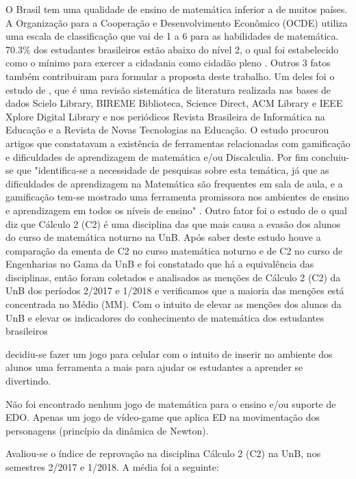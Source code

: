 O Brasil tem uma qualidade de ensino de matemática inferior a de muitos países. A Organização para a Cooperação e Desenvolvimento Econômico (OCDE) utiliza uma escala de classificação que vai de 1 a 6 para as habilidades de matemática. 70.3\% dos estudantes brasileiros estão abaixo do nível 2, o qual foi estabelecido como o mínimo para exercer a cidadania como cidadão pleno \cite{inep2015nivelcidadania}. Outros 3 fatos também contribuiram para formular a proposta deste trabalho. Um deles foi o estudo de \cite{revbibmatgam}, que é uma revisão sistemática de literatura realizada nas bases de dados Scielo Library, BIREME Biblioteca, Science Direct, ACM Library e IEEE Xplore Digital Library e nos periódicos Revista Brasileira de Informática na Educação e a Revista de Novas Tecnologias na Educação. O estudo procurou artigos que constatavam a existência de ferramentas relacionadas com gamificação e dificuldades de aprendizagem de matemática e/ou Discalculia. Por fim concluiu-se que "identifica-se a necessidade de pesquisas sobre esta temática, já que as dificuldades de aprendizagem na Matemática são frequentes
em sala de aula, e a gamificação tem-se mostrado uma ferramenta promissora nos ambientes de ensino e aprendizagem em todos os níveis de ensino" \cite{revbibmatgam}. Outro fator foi o estudo de \cite{evasaoC2} o qual diz que Cálculo 2 (C2) é uma disciplina das que mais causa a evasão dos alunos do curso de matemática noturno na UnB. Após saber deste estudo houve a comparação da ementa de C2 no curso matemática noturno e de C2 no curso de Engenharias no Gama da UnB e foi constatado que há a equivalência das disciplinas, então foram coletados e analisados as menções de Cálculo 2 (C2) da UnB dos períodos 2/2017 e 1/2018 e verificamos que a maioria das menções está concentrada no Médio (MM). Com o intuito de elevar as menções dos alunos da UnB e elevar os indicadores do conhecimento de matemática dos estudantes brasileiros 


decidiu-se fazer um jogo para celular com o intuito de inserir no ambiente dos alunos uma ferramenta a mais para ajudar os estudantes a aprender se divertindo. 

Não foi encontrado nenhum jogo de matemática para o ensino e/ou suporte de EDO. Apenas um jogo de vídeo-game que aplica ED na movimentação dos personagens (princípio da dinâmica de Newton)\cite{videoGameED}.

Avaliou-se o índice de reprovação na disciplina Cálculo 2 (C2) na UnB, nos semestres 2/2017 e 1/2018. A média foi a seguinte:

